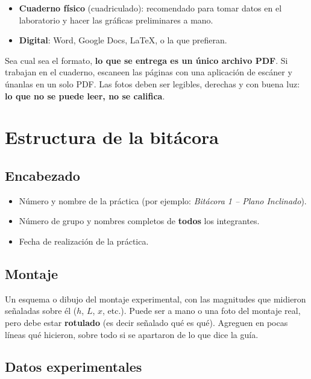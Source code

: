 \documentclass[11pt, letterpaper]{article}
\begin{document}
	\begin{itemize}
		\item \textbf{Cuaderno físico} (cuadriculado): recomendado para tomar datos
		en el laboratorio y hacer las gráficas preliminares a mano.
		\item \textbf{Digital}: Word, Google Docs, \LaTeX, o la que prefieran.
	\end{itemize}
	
	\noindent
	Sea cual sea el formato, \textbf{lo que se entrega es un único archivo PDF}.
	Si trabajan en el cuaderno, escaneen las páginas con una aplicación de
	escáner y únanlas en un solo PDF. Las fotos deben ser legibles, derechas y con buena
	luz: \textbf{lo que no se puede leer, no se califica}.
	
	\section{Estructura de la bitácora}
	
	\subsection{Encabezado}
	
	\begin{itemize}
		\item Número y nombre de la práctica (por ejemplo: \emph{Bitácora 1 --
			Plano Inclinado}).
		\item Número de grupo y nombres completos de \textbf{todos} los integrantes.
		\item Fecha de realización de la práctica.
	\end{itemize}
	
	\subsection{Montaje}
	
	Un esquema o dibujo del montaje experimental, con las magnitudes que midieron
	señaladas sobre él ($h$, $L$, $x$, etc.). Puede ser a mano o una foto del
	montaje real, pero debe estar \textbf{rotulado} (es decir señalado qué es qué). Agreguen en pocas líneas qué
	hicieron, sobre todo si se apartaron de lo que dice la guía.
	
	\subsection{Datos experimentales}
	
\end{document}
